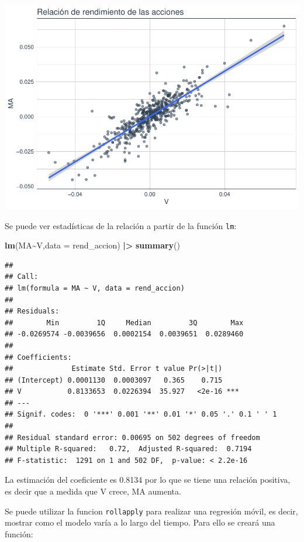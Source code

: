 \documentclass[
]{book}
\newenvironment{Shaded}{\begin{snugshade}}{\end{snugshade}}
\newcommand{\AttributeTok}[1]{\textcolor[rgb]{0.13,0.29,0.53}{#1}}
\newcommand{\FunctionTok}[1]{\textcolor[rgb]{0.13,0.29,0.53}{\textbf{#1}}}
\newcommand{\NormalTok}[1]{#1}
\newcommand{\SpecialCharTok}[1]{\textcolor[rgb]{0.81,0.36,0.00}{\textbf{#1}}}
\begin{document}
\includegraphics{Libro_TidyQualityTools_files/figure-latex/unnamed-chunk-71-1.pdf}

Se puede ver estadísticas de la relación a partir de la función \texttt{lm}:

\begin{Shaded}
\begin{Highlighting}[]
\FunctionTok{lm}\NormalTok{(MA}\SpecialCharTok{\textasciitilde{}}\NormalTok{V,}\AttributeTok{data =}\NormalTok{ rend\_accion) }\SpecialCharTok{|\textgreater{}} \FunctionTok{summary}\NormalTok{()}
\end{Highlighting}
\end{Shaded}

\begin{verbatim}
## 
## Call:
## lm(formula = MA ~ V, data = rend_accion)
## 
## Residuals:
##        Min         1Q     Median         3Q        Max 
## -0.0269574 -0.0039656  0.0002154  0.0039651  0.0289460 
## 
## Coefficients:
##              Estimate Std. Error t value Pr(>|t|)    
## (Intercept) 0.0001130  0.0003097   0.365    0.715    
## V           0.8133653  0.0226394  35.927   <2e-16 ***
## ---
## Signif. codes:  0 '***' 0.001 '**' 0.01 '*' 0.05 '.' 0.1 ' ' 1
## 
## Residual standard error: 0.00695 on 502 degrees of freedom
## Multiple R-squared:   0.72,  Adjusted R-squared:  0.7194 
## F-statistic:  1291 on 1 and 502 DF,  p-value: < 2.2e-16
\end{verbatim}

La estimación del coeficiente es 0.8134 por lo que se tiene una relación positiva, es decir que a medida que V crece, MA aumenta.

Se puede utilizar la funcion \texttt{rollapply} para realizar una regresión móvil, es decir, mostrar como el modelo varía a lo largo del tiempo. Para ello se creará una función:
\end{document}
